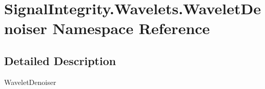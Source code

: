 \hypertarget{namespaceSignalIntegrity_1_1Wavelets_1_1WaveletDenoiser}{}\section{Signal\+Integrity.\+Wavelets.\+Wavelet\+Denoiser Namespace Reference}
\label{namespaceSignalIntegrity_1_1Wavelets_1_1WaveletDenoiser}


\subsection{Detailed Description}
\begin{DoxyVerb}WaveletDenoiser\end{DoxyVerb}
 